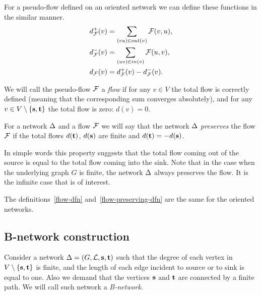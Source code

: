 \documentclass[12pt,oneside,a4paper]{amsart}
\begin{document}
      For a pseudo-flow defined on an oriented network we can define these functions in the similar manner.
      \begin{align*}
        &d^{+}_{\mathcal{F}}(v) = \sum_{(vu) \in out(v)} \mathcal{F}(v, u),\\
        &d^{-}_{\mathcal{F}}(v) = \sum_{(uv) \in in(v)} \mathcal{F}(u, v),\\
        &d_{\mathcal{F}}(v) = d^{+}_{\mathcal{F}}(v) - d^{-}_{\mathcal{F}}(v).
      \end{align*}
      \begin{definition}
        \label{flow-dfn}
        We will call the pseudo-flow $\mathcal{F}$ a \emph{flow} if
          for any $v \in V$ the total flow is correctly defined
          (meaning that the corresponding sum converges absolutely),
          and for any $v \in V \setminus \{\mathbf{s}, \mathbf{t}\}$ the total flow is zero: $d(v) = 0$.
      \end{definition}
      \begin{definition}
        \label{flow-preserving-dfn}
        For a network $\Delta$ and a flow $\mathcal{F}$ we will say that the network $\Delta$ \emph{preserves}
          the flow $\mathcal{F}$ if the total flows $d(\mathbf{t})$, $d(\mathbf{s})$ are finite
          and $d(\mathbf{t}) = -d(\mathbf{s})$.
      \end{definition}
      \begin{remark}
        In simple words this property suggests that the total flow coming out of the source is equal to the total flow
          coming into the sink.
        Note that in the case when the underlying graph $G$ is finite, the network $\Delta$ always preserves the flow.
        It is the infinite case that is of interest.
      \end{remark}
      The definitions~\ref{flow-dfn} and~\ref{flow-preserving-dfn} are the same for the oriented networks.


    \medskip
    \subsection{B-network construction}
      \begin{definition}
        Consider a network $\Delta = (G, \mathcal{L}, \mathbf{s}, \mathbf{t})$ such that
          the degree of each vertex in $V \setminus \{\mathbf{s}, \mathbf{t}\} $ is finite,
          and the length of each edge incident to source or to sink is equal to one.
        Also we demand that the vertices $\mathbf{s}$ and $\mathbf{t}$ are connected by a finite path.
        We will call such network a \emph{B-network}.
      \end{definition}
\end{document}
